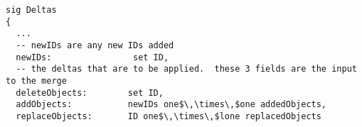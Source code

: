 \lstset{frame=tb, aboveskip=12pt, belowskip=-3pt, breaklines=true, basicstyle=\small\ttfamily, tabsize=2, mathescape=true}
\begin{lstlisting}[caption={deltas.als, lines 5-35}, label=alloy:delta-instructions, captionpos=b]
sig Deltas
{
  ...
  -- newIDs are any new IDs added
  newIDs:                set ID,  
  -- the deltas that are to be applied.  these 3 fields are the input to the merge
  deleteObjects:        set ID,
  addObjects:           newIDs one$\,\times\,$one addedObjects,
  replaceObjects:       ID one$\,\times\,$lone replacedObjects
\end{lstlisting}
